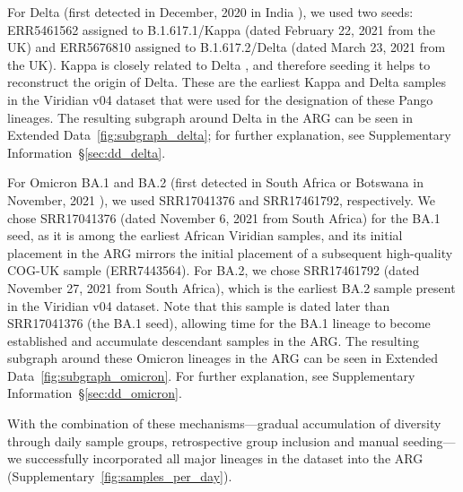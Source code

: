 \documentclass[12pt]{article}
\newcommand{\supref}[1]{Supplementary Information~\S\ref{#1}}
\newcommand{\edref}[1]{Extended Data~\ref{#1}}
\newcommand{\siref}[1]{Supplementary~\ref{#1}}
\begin{document}
For Delta
(first detected in December, 2020 in India \cite{ECDCVOCUpdates}),
we used two seeds:
ERR5461562 assigned to B.1.617.1/Kappa
(dated February 22, 2021 from the UK) and
ERR5676810 assigned to B.1.617.2/Delta
(dated March 23, 2021 from the UK).
Kappa is closely related to Delta \cite{Stern2021}, and
therefore seeding it helps to reconstruct the origin of Delta.
These are the earliest Kappa and Delta samples
in the Viridian v04 dataset
that were used for the designation of these Pango lineages.
The resulting subgraph around Delta in the ARG
can be seen in \edref{fig:subgraph_delta};
for further explanation, see \supref{sec:dd_delta}.

For Omicron BA.1 and BA.2
(first detected in South Africa or Botswana
in November, 2021 \cite{ECDCVOCUpdates}),
we used SRR17041376 and SRR17461792, respectively.
We chose SRR17041376 (dated November 6, 2021 from South Africa)
for the BA.1 seed, as it is among the earliest African Viridian samples,
and its initial placement in the ARG mirrors the initial placement of a subsequent high-quality COG-UK sample (ERR7443564).
For BA.2,
we chose SRR17461792 (dated November 27, 2021 from South Africa),
which is the earliest BA.2 sample present in the Viridian v04 dataset.
Note that this sample is dated later than SRR17041376 (the BA.1 seed),
allowing time for the BA.1 lineage
to become established and accumulate descendant samples in the ARG.
The resulting subgraph around these Omicron lineages in the ARG
can be seen in \edref{fig:subgraph_omicron}.
For further explanation, see \supref{sec:dd_omicron}.

With the combination of these mechanisms---gradual accumulation
of diversity through daily sample groups, retrospective group
inclusion and manual seeding---we successfully incorporated all major
lineages in the dataset into the ARG (\siref{fig:samples_per_day}).
\end{document}
